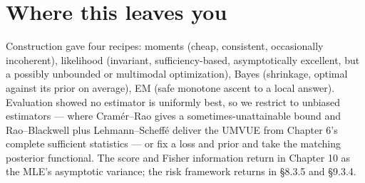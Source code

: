 \documentclass[11pt]{article}
\begin{document}
\section*{Where this leaves you}
Construction gave four recipes: moments (cheap, consistent, occasionally incoherent), likelihood (invariant, sufficiency-based, asymptotically excellent, but a possibly unbounded or multimodal optimization), Bayes (shrinkage, optimal against its prior on average), EM (safe monotone ascent to a local answer). Evaluation showed no estimator is uniformly best, so we restrict to unbiased estimators --- where Cram\'er--Rao gives a sometimes-unattainable bound and Rao--Blackwell plus Lehmann--Scheff\'e deliver the UMVUE from Chapter 6's complete sufficient statistics --- or fix a loss and prior and take the matching posterior functional. The score and Fisher information return in Chapter 10 as the MLE's asymptotic variance; the risk framework returns in \S8.3.5 and \S9.3.4.
\end{document}
